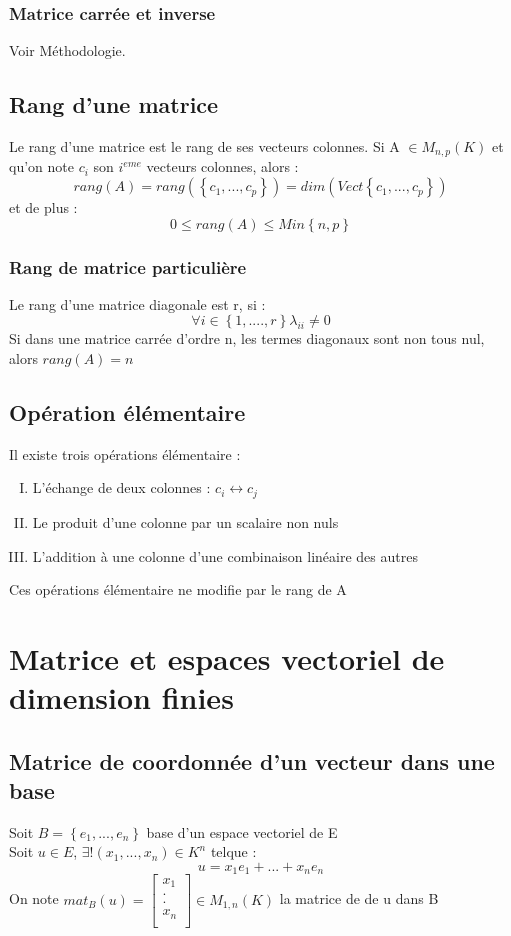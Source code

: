 \subsubsection{Matrice carrée et inverse}
Voir Méthodologie.
\subsection{Rang d'une matrice}
\begin{de}
Le rang d'une matrice est le rang de ses vecteurs colonnes.
Si A $\in M_{n,p}(K)$ et qu'on note $c_i$ son $i^{eme}$ vecteurs colonnes, alors :
$$rang(A)=rang(\left\{c_1,...,c_p\right\})=dim(Vect \left\{c_1,...,c_p\right\})$$
et de plus : 
$$0 \leq rang(A) \leq Min\left\{n,p\right\} $$
\end{de}
\subsubsection{Rang de matrice particulière}
Le rang d'une matrice diagonale est r, si : 
$$\forall i \in \left\{1,....,r\right\} \lambda_{ii} \neq 0$$
Si dans une matrice carrée d'ordre n, les termes diagonaux sont non tous nul, alors $rang(A)=n$
\subsection{Opération élémentaire}
\begin{de}
 Il existe trois opérations élémentaire :
\begin{enumerate}[I) ]
 \item L'échange de deux colonnes : $c_i \leftrightarrow c_j$
 \item Le produit d'une colonne par un scalaire non nuls
 \item L'addition à une colonne d'une combinaison linéaire des autres
\end{enumerate}
Ces opérations élémentaire ne modifie par le rang de A
\end{de}
\section{Matrice et espaces vectoriel de dimension finies}
\subsection{Matrice de coordonnée d'un vecteur dans une base}
\begin{de}
Soit $B=\left\{e_1,...,e_n\right\}$ base d'un espace vectoriel de E\\
Soit $u \in E$, $\exists !(x_1,...,x_n) \in K^n$ telque : 
$$ u = x_1e_1+...+x_ne_n$$
On note $mat_{B}(u)=\begin{bmatrix}
x_1\\
.\\
.\\
x_n\\
\end{bmatrix} \in M_{1,n}(K)$ la matrice de de u dans B 
\end{de}
